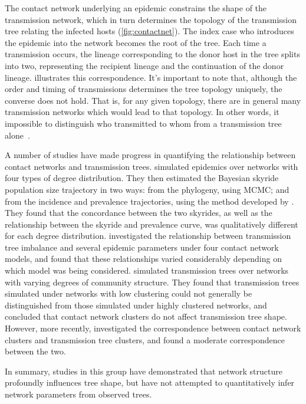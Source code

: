 The contact network underlying an epidemic constrains the shape of the
transmission network, which in turn determines the topology of the transmission
tree relating the infected hosts (\cref{fig:contactnet}). The index case who
introduces the epidemic into the network becomes the root of the tree. Each
time a transmission occurs, the lineage corresponding to the donor host in the
tree splits into two, representing the recipient lineage and the continuation
of the donor lineage.  illustrates this correspondence.
It's important to note that, although the order and timing of transmissions
determines the tree topology uniquely, the converse does not hold. That is, for
any given topology, there are in general many transmission networks which would
lead to that topology. In other words, it impossible to distinguish who
transmitted to whom from a transmission tree alone~\autocite{bernard2007hiv}.

A number of studies have made progress in quantifying the relationship between
contact networks and transmission trees. \textcite{o2010contact} simulated
epidemics over networks with four types of degree distribution. They then
estimated the Bayesian skyride~\autocite{minin2008smooth} population size
trajectory in two ways: from the phylogeny, using \gls{MCMC}; and from the
incidence and prevalence trajectories, using the method developed by 
\textcite{volz2009phylodynamics}. They found that the concordance between
the two skyrides, as well as the relationship between the skyride and
prevalence curve, was qualitatively different for each degree distribution.
\textcite{leventhal2012inferring} investigated the relationship between
transmission tree imbalance and several epidemic parameters under four contact
network models, and found that these relationships varied considerably
depending on which model was being considered. \textcite{welch2011network}
simulated transmission trees over networks with varying degrees of community
structure. They found that transmission trees simulated under networks with low
clustering could not generally be distinguished from those simulated under
highly clustered networks, and concluded that contact network clusters do not
affect transmission tree shape. However, more recently,
\textcite{villandre2016assessment} investigated the correspondence between
contact network clusters and transmission tree clusters, and found a moderate
correspondence between the two.

In summary, studies in this group have demonstrated that network structure
profoundly influences tree shape, but have not attempted to quantitatively
infer network parameters from observed trees.

